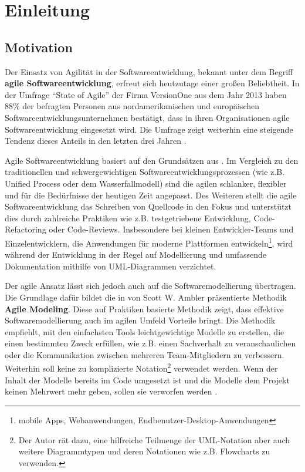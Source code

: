 
\chapter{Einleitung}
\label{chapter:introduction}

\section{Motivation}

Der Einsatz von Agilität in der Softwareentwicklung, bekannt unter dem Begriff \textbf{agile Softwareentwicklung}, erfreut sich heutzutage einer großen Beliebtheit. In der Umfrage \enquote{State of Agile} der Firma VersionOne aus dem Jahr 2013 haben 88\% der befragten Personen aus nordamerikanischen und europäischen Softwareentwicklungsunternehmen bestätigt, dass in ihren Organisationen agile Softwareentwicklung eingesetzt wird. Die Umfrage zeigt weiterhin eine steigende Tendenz dieses Anteils in den letzten drei Jahren \cite{VersionOne148th-Annual}.

Agile Softwareentwicklung basiert auf den Grundsätzen aus \cite{BeckBeedle01Manifest}. Im Vergleich zu den traditionellen und schwergewichtigen Softwareentwicklungsprozessen (wie z.B. Unified Process oder dem Wasserfallmodell) sind die agilen schlanker, flexibler und für die Bedürfnisse der heutigen Zeit angepasst. Des Weiteren stellt die agile Softwareentwicklung das Schreiben von Quellcode in den Fokus und unterstützt dies durch zahlreiche Praktiken wie z.B. testgetriebene Entwicklung, Code-Refactoring oder Code-Reviews. Insbesondere bei kleinen Entwickler-Teams und Einzelentwicklern, die Anwendungen für moderne Plattformen entwickeln\footnote{mobile Apps, Webanwendungen, Endbenutzer-Desktop-Anwendungen}, wird während der Entwicklung in der Regel auf Modellierung und umfassende Dokumentation mithilfe von UML-Dia\-gram\-men verzichtet.

Der agile Ansatz lässt sich jedoch auch auf die Softwaremodellierung übertragen. Die Grundlage dafür bildet die in \cite{Ambler02Agile} von Scott W. Ambler präsentierte Methodik \textbf{Agile Modeling}. Diese auf Praktiken basierte Methodik zeigt, dass effektive Softwaremodellierung auch im agilen Umfeld Vorteile bringt. Die Methodik empfiehlt, mit den einfachsten Tools leichtgewichtige Modelle zu erstellen, die einen bestimmten Zweck erfüllen, wie z.B. einen Sachverhalt zu veranschaulichen oder die Kommunikation zwischen mehreren Team-Mitgliedern zu verbessern. Weiterhin soll keine zu komplizierte Notation\footnote{Der Autor rät dazu, eine hilfreiche Teilmenge der UML-Notation aber auch weitere Diagrammtypen und deren Notationen wie z.B. Flowcharts zu verwenden.} verwendet werden. Wenn der Inhalt der Modelle bereits im Code umgesetzt ist und die Modelle dem Projekt keinen Mehrwert mehr geben, sollen sie verworfen werden \cite{Ambler02Agile}.

